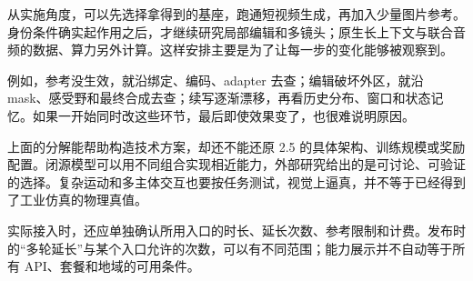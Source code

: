 从实施角度，可以先选择拿得到的基座，跑通短视频生成，再加入少量图片参考。身份条件确实起作用之后，才继续研究局部编辑和多镜头；原生长上下文与联合音频的数据、算力另外计算。这样安排主要是为了让每一步的变化能够被观察到。

例如，参考没生效，就沿绑定、编码、adapter 去查；编辑破坏外区，就沿 mask、感受野和最终合成去查；续写逐渐漂移，再看历史分布、窗口和状态记忆。如果一开始同时改这些环节，最后即使效果变了，也很难说明原因。

上面的分解能帮助构造技术方案，却还不能还原 2.5 的具体架构、训练规模或奖励配置。闭源模型可以用不同组合实现相近能力，外部研究给出的是可讨论、可验证的选择。复杂运动和多主体交互也要按任务测试，视觉上逼真，并不等于已经得到了工业仿真的物理真值。

实际接入时，还应单独确认所用入口的时长、延长次数、参考限制和计费。发布时的``多轮延长''与某个入口允许的次数，可以有不同范围；能力展示并不自动等于所有 API、套餐和地域的可用条件。
